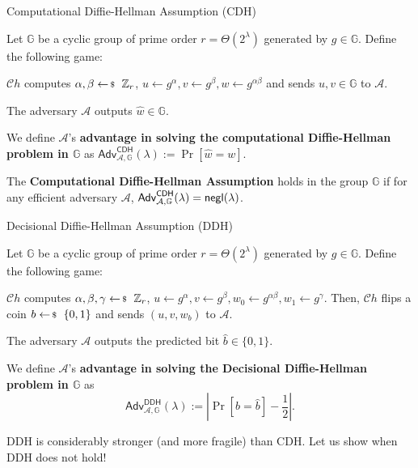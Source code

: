 \documentclass{zkdl-presentation-template}
\begin{document}
    \begin{frame}{Computational Diffie-Hellman Assumption (CDH)}
        \begin{definition}
            Let $\mathbb{G}$ be a cyclic group of prime order $r = \Theta(2^{\lambda})$ generated by $g \in \mathbb{G}$. Define the following game:
            \begin{algoen}
                \item $\mathcal{C}h$ computes $\alpha, \beta \leftarrowS \mathbb{Z}_r$, $u \gets g^{\alpha}, v \gets g^{\beta}, w \gets g^{\alpha\beta}$ and sends $u,v \in \mathbb{G}$ to $\mathcal{A}$.
                \item The adversary $\mathcal{A}$ outputs $\widehat{w} \in \mathbb{G}$.
            \end{algoen}
            We define $\mathcal{A}$'s \textbf{advantage in solving the computational Diffie-Hellman problem in $\mathbb{G}$} as $\textsf{Adv}^{\textsf{CDH}}_{\mathcal{A},\mathbb{G}}(\lambda) := \Pr[\widehat{w} = w]$.
        \end{definition}
        \pause

        \begin{definition}
            The \textbf{Computational Diffie-Hellman Assumption} holds in the group $\mathbb{G}$ if for any efficient adversary $\mathcal{A}$, $\textsf{Adv}^{\textsf{CDH}}_{\mathcal{A},\mathbb{G}}(\lambda) = \mathsf{negl}(\lambda)$.
        \end{definition}
    \end{frame}

    \begin{frame}{Decisional Diffie-Hellman Assumption (DDH)}
        \begin{definition}
            Let $\mathbb{G}$ be a cyclic group of prime order $r = \Theta(2^{\lambda})$ generated by $g \in \mathbb{G}$. Define the following game:
            \begin{algoen}
                \item $\mathcal{C}h$ computes $\alpha, \beta,\gamma \leftarrowS \mathbb{Z}_r$, $u \gets g^{\alpha}, v \gets g^{\beta}, w_0 \gets g^{\alpha\beta}, w_1 \gets g^{\gamma}$. Then, $\mathcal{C}h$ flips a coin $b \leftarrowS \{0,1\}$ and sends $(u,v,w_b)$ to $\mathcal{A}$.
                \item The adversary $\mathcal{A}$ outputs the predicted bit $\widehat{b} \in \{0,1\}$.
            \end{algoen}
            We define $\mathcal{A}$'s \textbf{advantage in solving the Decisional Diffie-Hellman problem in $\mathbb{G}$} as
            \begin{equation*}
                \textsf{Adv}^{\textsf{DDH}}_{\mathcal{A},\mathbb{G}}(\lambda) := \left| \Pr[b = \widehat{b}] - \frac{1}{2} \right|.
            \end{equation*}
        \end{definition}
        \pause

        DDH is considerably stronger (and more fragile) than CDH. Let us show when DDH does not hold!
    \end{frame}
\end{document}
